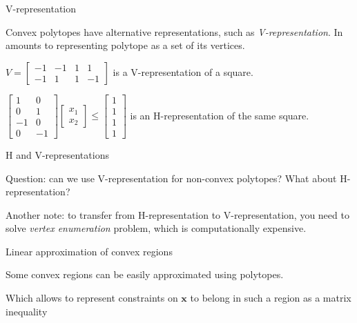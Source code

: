 \documentclass{beamer}
\begin{document}
\begin{frame}{V-representation}
\begin{flushleft}

Convex polytopes have alternative representations, such as \emph{V-representation}. In amounts to representing polytope as a set of its vertices.

\begin{example}
$V = \begin{bmatrix} -1 & -1 & 1 & 1 \\ -1 & 1 & 1 & -1 \end{bmatrix}$ is a V-representation of a square.
\end{example}

\begin{example}
$\begin{bmatrix} 1 & 0 \\ 0 & 1 \\ -1 & 0 \\ 0 & -1 \end{bmatrix}
\begin{bmatrix} x_1 \\ x_2 \end{bmatrix} \leq
\begin{bmatrix} 1 \\ 1 \\ 1 \\ 1 \end{bmatrix}$
is an H-representation of the same square.
\end{example}
 
\end{flushleft}
\end{frame}



\begin{frame}{H and V-representations}
\begin{flushleft}

Question: can we use V-representation for non-convex polytopes? What about H-representation?

\bigskip

Another note: to transfer from H-representation to V-representation, you need to solve \emph{vertex enumeration} problem, which is computationally expensive.
 
\end{flushleft}
\end{frame}




\begin{frame}{Linear approximation of convex regions}
\begin{flushleft}
Some convex regions can be easily approximated using polytopes.



Which allows to represent constraints on $\mathbf{x}$ to belong in such a region as a matrix inequality
 
\end{flushleft}
\end{frame}
\end{document}
